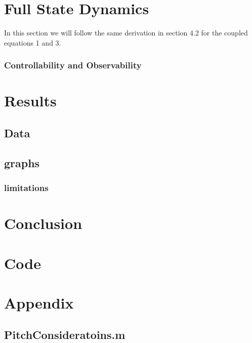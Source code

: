 \documentclass{article}
\begin{document}
\section{Full State Dynamics}
In this section we will follow the same derivation in section 4.2 for the coupled equations 1 and 3.
\subsubsection{Controllability and Observability}

\section{Results}

\subsection{Data}
\subsection{graphs}
\subsubsection{limitations}

\section{Conclusion}
\section{Code}

\section{Appendix}
\subsection{PitchConsideratoins.m}
\end{document}
